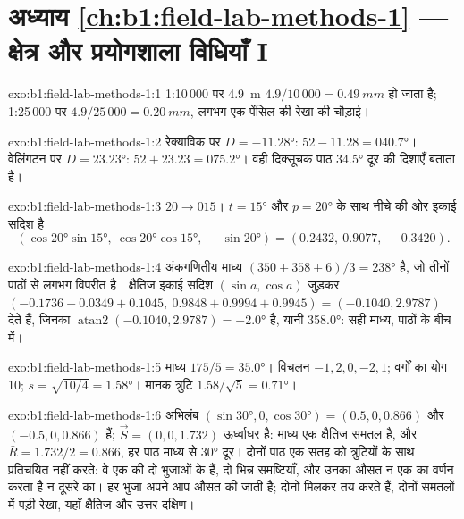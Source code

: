 \section*{अध्याय \ref{ch:b1:field-lab-methods-1} --- क्षेत्र और प्रयोगशाला विधियाँ I}

\begin{solution}{exo:b1:field-lab-methods-1:1}
1:10\,000 पर \qty{4.9}{m} $4.9/10\,000 = \qty{0.49}{mm}$ हो जाता है; 1:25\,000 पर $4.9/25\,000 = \qty{0.20}{mm}$,
लगभग एक पेंसिल की रेखा की चौड़ाई।
\end{solution}

\begin{solution}{exo:b1:field-lab-methods-1:2}
रेक्याविक पर $D = \ang{-11.28}$: $52 - 11.28 = \ang{040.7}$। वेलिंगटन पर $D = \ang{+23.23}$: $52 + 23.23 = \ang{075.2}$।
वही दिक्सूचक पाठ \ang{34.5} दूर की दिशाएँ बताता है।
\end{solution}

\begin{solution}{exo:b1:field-lab-methods-1:3}
$20\to015$। $t = \ang{15}$ और $p = \ang{20}$ के साथ नीचे की ओर इकाई सदिश है
\[
  (\cos\ang{20}\sin\ang{15},\ \cos\ang{20}\cos\ang{15},\ -\sin\ang{20}) =
  (0.2432,\ 0.9077,\ -0.3420).
\]
\end{solution}

\begin{solution}{exo:b1:field-lab-methods-1:4}
अंकगणितीय माध्य $(350 + 358 + 6)/3 = \ang{238}$ है, जो तीनों पाठों से लगभग विपरीत है। क्षैतिज इकाई सदिश
$(\sin a, \cos a)$ जुड़कर $(-0.1736 - 0.0349 + 0.1045,\ 0.9848 + 0.9994 + 0.9945) = (-0.1040, 2.9787)$ देते हैं,
जिनका  $\operatorname{atan2}(-0.1040, 2.9787) = \ang{-2.0}$ है, यानी \ang{358.0}: सही माध्य, पाठों के बीच में।
\end{solution}

\begin{solution}{exo:b1:field-lab-methods-1:5}
माध्य $175/5 = \ang{35.0}$। विचलन $-1, 2, 0, -2, 1$; वर्गों का योग 10;
$s = \sqrt{10/4} = \ang{1.58}$। मानक त्रुटि $1.58/\sqrt5 = \ang{0.71}$।
\end{solution}

\begin{solution}{exo:b1:field-lab-methods-1:6}
अभिलंब $(\sin\ang{30}, 0, \cos\ang{30}) = (0.5, 0, 0.866)$ और
$(-0.5, 0, 0.866)$ हैं; $\vec S = (0, 0, 1.732)$ ऊर्ध्वाधर है: माध्य एक क्षैतिज समतल है, और $\bar R = 1.732/2 = 0.866$, हर
पाठ माध्य से \ang{30} दूर। दोनों पाठ एक सतह को त्रुटियों के साथ प्रतिचयित नहीं करते: वे एक  की दो भुजाओं के हैं,
दो भिन्न समष्टियाँ, और उनका औसत न एक का वर्णन करता है न दूसरे का। हर भुजा अपने आप औसत की जाती है; दोनों मिलकर
 तय करते हैं, दोनों समतलों में पड़ी रेखा, यहाँ क्षैतिज और उत्तर-दक्षिण।
\end{solution}

